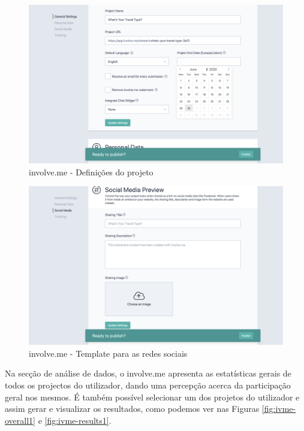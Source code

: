 \begin{figure}[ht!]
	\begin{center}
		\includegraphics[width=1\textwidth]{img/ivme/project}
		\caption{involve.me - Definições do projeto}
		\label{fig:ivme-project}
	\end{center}
\end{figure}

\begin{figure}[ht!]
	\begin{center}
		\includegraphics[width=1\textwidth]{img/ivme/social}
		\caption{involve.me - Template para as redes sociais}
		\label{fig:ivme-social}
	\end{center}
\end{figure}


Na secção de análise de dados, o involve.me apresenta as estatísticas gerais de todos os projectos do utilizador, dando uma percepção acerca da participação geral nos mesmos. É também possível selecionar um dos projetos do utilizador e assim gerar e visualizar os resultados, como podemos ver nas Figuras \ref{fig:ivme-overall1} e \ref{fig:ivme-results1}.

